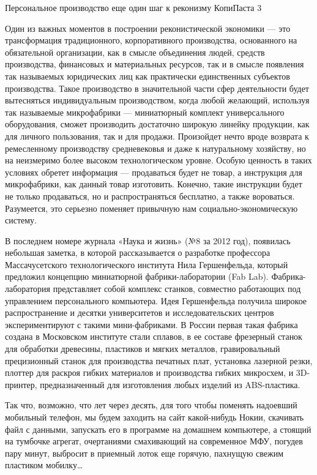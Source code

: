 \begin{news}{2}
	{Персональное производство}
	{еще один шаг к реконизму}
	{КопиПаста}
	{3}

Один из важных моментов в построении реконистической экономики — это
трансформация традиционного, корпоративного производства, основанного на
обязательной организации, как в смысле объединения людей, средств производства,
финансовых и материальных ресурсов, так и в смысле появления так называемых
юридических лиц как практически единственных субъектов производства. Такое
производство в значительной части сфер деятельности будет вытесняться
индивидуальным производством, когда  любой желающий, используя так называемые
микрофабрики — миниатюрный комплект универсального оборудования, сможет
производить достаточно широкую линейку продукции, как для личного пользования,
так и для продажи. Произойдет нечто вроде возврата к ремесленному производству
средневековья и даже к натуральному хозяйству, но на неизмеримо более высоком
технологическом уровне. Особую ценность в таких условиях обретет информация —
продаваться будет не товар, а инструкция для микрофабрики, как данный товар
изготовить. Конечно, такие инструкции будет не только продаваться, но и
распространяться бесплатно, а также вороваться. Разумеется, это серьезно
поменяет привычную нам социально-экономическую систему.

В последнем номере журнала «Наука и жизнь» (№8 за 2012 год), появилась небольшая
заметка, в которой рассказывается о разработке профессора Массачусетского
технологического института Нила Гершенфельда, который предложил концепцию
миниатюрной фабрики-лаборатории (Fab Lab). Фабрика-лаборатория представляет
собой комплекс станков, совместно работающих под управлением персонального
компьютера. Идея Гершенфельда получила широкое распространение и десятки
университетов и исследовательских центров экспериментируют с такими
мини-фабриками. В России первая такая фабрика создана в Московском институте
стали сплавов, в ее составе фрезерный станок для обработки древесины, пластиков
и мягких металлов, гравировальный прецизионный станок для производства печатных
плат, установка лазерной резки, плоттер для раскроя гибких материалов и
производства гибких микросхем, и 3D-принтер, предназначенный для изготовления
любых изделий из ABS-пластика.

Так что, возможно, что лет через десять, для того чтобы поменять надоевший
мобильный телефон, мы будем заходить на сайт какой-нибудь Нокии, скачивать файл
с данными, запускать его в программе на домашнем компьютере, а стоящий на
тумбочке агрегат, очертаниями смахивающий на современное МФУ, погудев пару
минут, выбросит в приемный лоток еще горячую, пахнущую свежим пластиком
мобилку\ldots
\smiley
	
\end{news}

